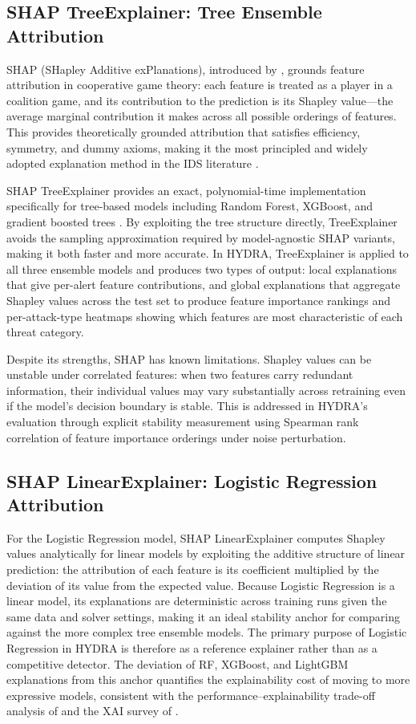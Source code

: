 \documentclass[12pt,a4paper]{report}
\begin{document}
\subsection{SHAP TreeExplainer: Tree Ensemble Attribution}
\label{sec:shap-tree}

SHAP (SHapley Additive exPlanations), introduced by \citet{lundberg2017}, grounds feature attribution in cooperative game theory: each feature is treated as a player in a coalition game, and its contribution to the prediction is its Shapley value---the average marginal contribution it makes across all possible orderings of features. This provides theoretically grounded attribution that satisfies efficiency, symmetry, and dummy axioms, making it the most principled and widely adopted explanation method in the IDS literature \citep{lundberg2022}.

SHAP TreeExplainer provides an exact, polynomial-time implementation specifically for tree-based models including Random Forest, XGBoost, and gradient boosted trees \citep{lundberg2020}. By exploiting the tree structure directly, TreeExplainer avoids the sampling approximation required by model-agnostic SHAP variants, making it both faster and more accurate. In HYDRA, TreeExplainer is applied to all three ensemble models and produces two types of output: local explanations that give per-alert feature contributions, and global explanations that aggregate Shapley values across the test set to produce feature importance rankings and per-attack-type heatmaps showing which features are most characteristic of each threat category.

Despite its strengths, SHAP has known limitations. Shapley values can be unstable under correlated features: when two features carry redundant information, their individual values may vary substantially across retraining even if the model's decision boundary is stable. This is addressed in HYDRA's evaluation through explicit stability measurement using Spearman rank correlation of feature importance orderings under noise perturbation.

\subsection{SHAP LinearExplainer: Logistic Regression Attribution}
\label{sec:shap-linear}

For the Logistic Regression model, SHAP LinearExplainer computes Shapley values analytically for linear models by exploiting the additive structure of linear prediction: the attribution of each feature is its coefficient multiplied by the deviation of its value from the expected value. Because Logistic Regression is a linear model, its explanations are deterministic across training runs given the same data and solver settings, making it an ideal stability anchor for comparing against the more complex tree ensemble models. The primary purpose of Logistic Regression in HYDRA is therefore as a reference explainer rather than as a competitive detector. The deviation of RF, XGBoost, and LightGBM explanations from this anchor quantifies the explainability cost of moving to more expressive models, consistent with the performance--explainability trade-off analysis of \citet{bhatt2020} and the XAI survey of \citet{adadi2018}.
\end{document}
